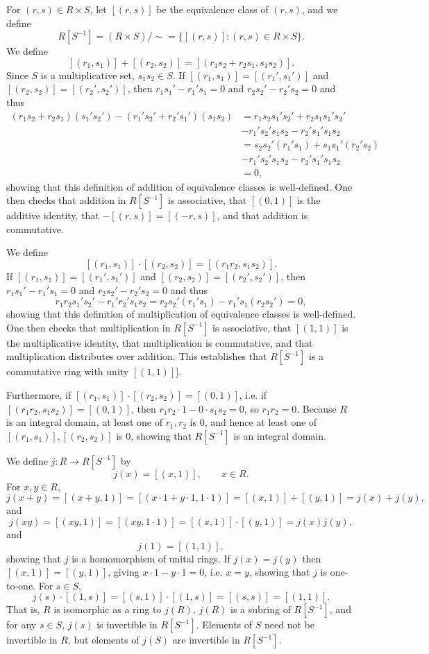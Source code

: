 \documentclass{article}
\theoremstyle{definition}
\theoremstyle{definition}
\begin{document}
For $(r,s) \in R \times S$, let $[(r,s)]$ be the equivalence class of $(r,s)$, and we define
\[
R[S^{-1}] = (R \times S) / \sim = \{[(r,s)] : (r,s) \in R \times S\}.
\]
We define
\[
[(r_1,s_1)]+[(r_2,s_2)] = [(r_1s_2+r_2s_1,s_1s_2)].
\]
Since $S$ is a multiplicative set, $s_1s_2 \in S$. If $[(r_1,s_1)]=[(r_1',s_1')]$ and $[(r_2,s_2)]=[(r_2',s_2')]$, then
$r_1s_1'-r_1's_1=0$ and $r_2s_2'-r_2's_2=0$
and thus
\begin{align*}
(r_1s_2+r_2s_1)(s_1's_2')-
(r_1's_2'+r_2's_1')(s_1s_2)&=r_1s_2s_1's_2'+r_2s_1s_1's_2'\\
&-r_1's_2's_1s_2-r_2's_1's_1s_2\\
&=s_2s_2'(r_1's_1)+s_1s_1'(r_2's_2)\\
&-r_1's_2's_1s_2-r_2's_1's_1s_2\\
&=0,
\end{align*}
showing that this definition of addition of equivalence classes is well-defined.
One then checks that addition in $R[S^{-1}]$ is associative, that 
$[(0,1)]$ is the additive identity, that $-[(r,s)]=[(-r,s)]$, and that addition is commutative.

We define 
\[
[(r_1,s_1)] \cdot [(r_2,s_2)] = [(r_1r_2,s_1s_2)].
\]
If $[(r_1,s_1)]=[(r_1',s_1')]$ and $[(r_2,s_2)]=[(r_2',s_2')]$, then
$r_1s_1'-r_1's_1=0$ and $r_2s_2'-r_2's_2=0$
and thus 
\[
r_1r_2s_1's_2'-r_1'r_2's_1s_2=
r_2s_2'(r_1's_1)
-r_1's_1(r_2s_2')
=0,
\]
showing that this definition of multiplication of equivalence classes is well-defined. 
One then checks that multiplication in $R[S^{-1}]$ is associative, that $[(1,1)]$ is the multiplicative identity, that
multiplication is commutative, and 
 that 
multiplication distributes over addition. This establishes that $R[S^{-1}]$ is a commutative ring with unity $[(1,1)]]$. 

Furthermore, if $[(r_1,s_1)] \cdot [(r_2,s_2)] = [(0,1)]$, i.e. if $[(r_1r_2,s_1s_2)]=[(0,1)]$, then
$r_1r_2\cdot 1 - 0\cdot s_1s_2=0$, so $r_1r_2=0$. Because $R$ is an integral domain, at least one of $r_1,r_2$ is $0$, and hence
at least one of $[(r_1,s_1)], [(r_2,s_2)]$ is $0$, showing that $R[S^{-1}]$ is an integral domain.

We define $j:R \to R[S^{-1}]$ by 
\[
j(x) = [(x,1)], \qquad x \in R.
\]
For $x,y \in R$,
\[
j(x+y)=[(x+y,1)]=[(x\cdot 1+y\cdot 1,1\cdot 1)]=[(x,1)]+[(y,1)]=j(x)+j(y),
\]
and 
\[
j(xy)=[(xy,1)]=[(xy,1\cdot 1)]=[(x,1)] \cdot [(y,1)] = j(x) j(y),
\]
and
\[
j(1)=[(1,1)],
\]
showing that $j$ is a homomorphism of unital rings.
If $j(x)=j(y)$ then $[(x,1)]=[(y,1)]$, giving $x\cdot 1-y\cdot 1=0$, i.e. $x=y$, showing that $j$ is one-to-one. 
For $s \in S$,
\[
j(s)\cdot [(1,s)]=[(s,1)]\cdot [(1,s)]=[(s,s)] = [(1,1)].
\]
That is, $R$ is isomorphic as a ring to $j(R)$, $j(R)$ is a subring of $R[S^{-1}]$, and for any $s \in S$, $j(s)$ is invertible in $R[S^{-1}]$. 
Elements of $S$ need not be invertible in $R$, but elements of $j(S)$ are invertible in $R[S^{-1}]$. 
\end{document}

